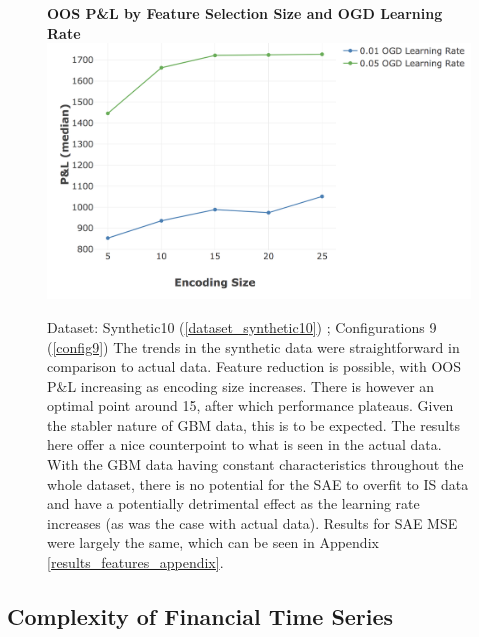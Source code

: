 \documentclass[a4paper,11pt,oneside]{article}
\theoremstyle{plain}
\theoremstyle{definition}
\begin{document}
	\begin{figure}[H]
		\centering 
		\textbf{OOS P\&L by Feature Selection Size and OGD Learning Rate}
		\includegraphics[scale=0.36]{images/results/8_5_synthetic_data/synthetic_median.png} 
		\caption[OOS P\&L by Feature Selection Size and OGD Learning Rate (Synthetic Data)]{Dataset: Synthetic10 (\ref{dataset_synthetic10}) ; Configurations 9 (\ref{config9})
			\newline The trends in the synthetic data were straightforward in comparison to actual data. Feature reduction is possible, with OOS P\&L increasing as encoding size increases. There is however an optimal point around 15, after which performance plateaus. Given the stabler nature of GBM data, this is to be expected. The results here offer a nice counterpoint to what is seen in the actual data. With the GBM data having constant characteristics throughout the whole dataset, there is no potential for the SAE to overfit to IS data and have a potentially detrimental effect as the learning rate increases (as was the case with actual data). Results for SAE MSE were largely the same, which can be seen in Appendix \ref{results_features_appendix}.
		}
		\label{figure-synthetic_median}
	\end{figure}
	
	\newpage
	
	
	
	
	
	
	
	
	
	
	
	\newpage
	
	\subsection{Complexity of Financial Time Series}\label{results_finance_data}
	
\end{document}
